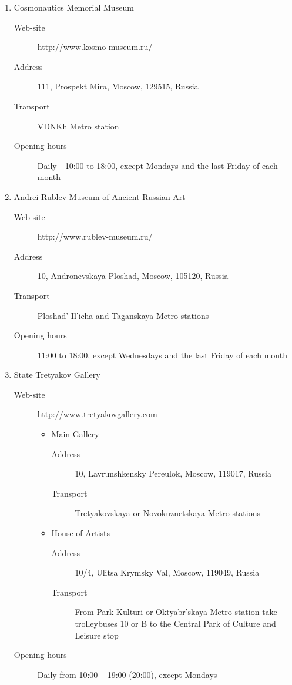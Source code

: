 \documentclass[10pt,fleqn,openany]{book} %
\begin{document}
\begin{enumerate}
	\item Cosmonautics Memorial Museum
		\begin{description}
			\item[Web-site] http://www.kosmo-museum.ru/
			\item[Address] 111, Prospekt Mira, Moscow, 129515, Russia 
			\item[Transport] VDNKh Metro station
			\item[Opening hours] Daily - 10:00 to 18:00, except Mondays and the last Friday of each month
		\end{description}
	
	\item Andrei Rublev Museum of Ancient Russian Art
			\begin{description}
				\item[Web-site] http://www.rublev-museum.ru/ 
				\item[Address] 10, Andronevskaya Ploshad, Moscow, 105120, Russia 
				\item[Transport] Ploshad' Il'icha and Taganskaya Metro stations
				\item[Opening hours] 11:00 to 18:00, except Wednesdays and the last Friday of each month
			\end{description}
			
	\item State Tretyakov Gallery
	\begin{description}
		\item[Web-site] http://www.tretyakovgallery.com
		\begin{itemize}
			\item Main Gallery
				\begin{description}
					\item[Address] 10, Lavrunshkensky Pereulok, Moscow, 119017, Russia 
					\item[Transport] Tretyakovskaya or Novokuznetskaya Metro stations
			    \end{description}
   			\item House of Artists
	   			\begin{description}
					\item[Address] 10/4, Ulitsa Krymsky Val, Moscow, 119049, Russia 
					\item[Transport] From Park Kulturi or Oktyabr'skaya Metro station take trolleybuses 10 or B to the Central Park of Culture and Leisure stop
	   			\end{description}
		\end{itemize}
		\item[Opening hours] Daily from 10:00 – 19:00 (20:00), except Mondays 
	\end{description}
	

\end{enumerate}
\end{document}
